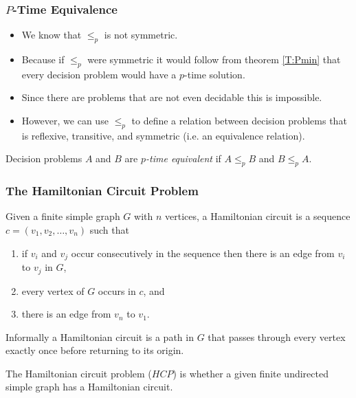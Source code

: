\documentclass[handout]{beamer}
\begin{document}
\begin{frame}
\frametitle{$P$-Time Equivalence}
\begin{itemize}
\item We know that $\leq_p$ is not symmetric. 
\item Because if $\leq_p$ were symmetric it would follow from theorem \ref{T:Pmin} that every decision problem would have a $p$-time solution. 
\item Since there are problems that are not even decidable this is impossible. 
\item However, we can use $\leq_p$ to define a relation between decision problems that is reflexive, transitive, and symmetric (i.e. an equivalence relation).
\end{itemize} 
\begin{definition}[$\equiv_p$]
Decision problems $A$ and $B$ are \emph{$p$-time equivalent} if $A\leq_p B$ and $B\leq_p A$.
\end{definition} 

\end{frame}

\begin{frame}
\frametitle{The Hamiltonian Circuit Problem}
\begin{definition} 
Given a finite simple graph $G$ with $n$ vertices, a Hamiltonian circuit is a sequence $c=(v_1,v_2,\ldots,v_n)$ such that
\begin{enumerate}
\item if $v_i$ and $v_j$ occur consecutively in the sequence then there is an edge from $v_i$ to  $v_j$ in $G$,
\item every vertex of $G$ occurs in $c$, and
\item there is an edge from $v_n$ to $v_1$.  
\end{enumerate}  
\end{definition}
Informally a Hamiltonian circuit is a path in $G$ that passes through every vertex exactly once before returning to its origin.
\begin{definition}[$HCP$]
The Hamiltonian circuit problem ($HCP$) is whether a given finite undirected simple graph has a Hamiltonian circuit.
\end{definition}

\end{frame}
\end{document}
